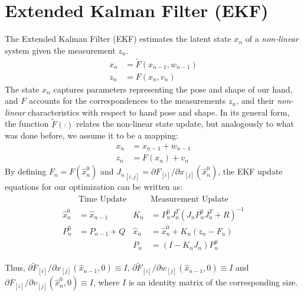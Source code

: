 \section{Extended Kalman Filter (EKF)}
The Extended Kalman Filter (EKF) estimates the latent state $x_n$ of a \emph{non-linear} system given the measurement $z_n$.
% 
\begin{align}
x_n &= \tilde{F}(x_{n - 1},  w_{n - 1}) \\
z_n &= F(x_n, v_n)
\end{align}
% 
The state $x_n$ captures parameters representing the pose and shape of our hand, and $F$ accounts for the correspondences to the measurements $z_n$, and their \emph{non-linear} characteristics with respect to hand pose and shape. In its general form, the function $\tilde{F}(\cdot)$ relates the non-linear state update, but analogously to what was done before, we assume it to be a   mapping:
% 
\begin{align}
x_n &= x_{n - 1} + w_{n - 1} \\
z_n &= F(x_n) + v_n 
\end{align}
%
By defining $F_n = F(\hat{x}_n^0)$ and ${J_n}_{[i, j]} = \partial F_{[i]} / \partial x_{[j]}(\hat{x}_n^0)$, the EKF update equations for our optimization can be written as:
% 
\begin{gather}
\begin{aligned}
&\text{Time Update}                 &       &\text{Measurement Update} \\
\hat{x}_n^0 &=\hat{x}_{n-1}           &       K_n &= P_n^0 J_n^T(J_n P_n^0 J_n^T + R)^{-1}\\
P_n^0 &= P_{n-1} + Q                 &       \hat{x}_n &= \hat{x}_n^0 + K_n(z_n - F_n) \\
&                                   &       P_n &= (I - K_n J_n)P_n^0
\end{aligned}
\label{eq:kalman}
\end{gather}
% 
\begin{DRAFT}
Thus, ${ \partial \tilde{F}_{[i]}}/{ \partial x_{[j]}}(\hat{x}_{n - 1}, 0) \equiv I$, ${ \partial \tilde{F}_{[i]}}/{ \partial w_{[j]}}(\hat{x}_{n - 1}, 0) \equiv I$ and ${ \partial F_{[i]}}/{ \partial v_{[j]}}(\hat{x}_n^0, 0) \equiv I$, where $I$ is an identity matrix of the corresponding size.    
\end{DRAFT}





 
